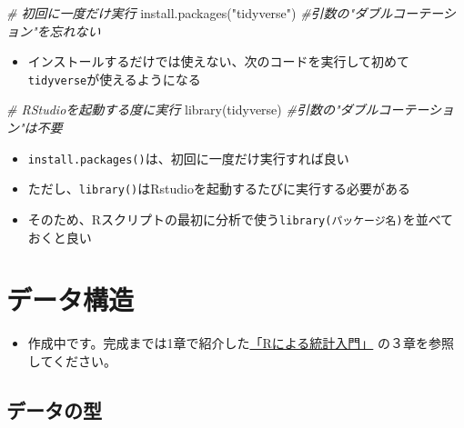 \documentclass[
]{book}
\newenvironment{Shaded}{\begin{snugshade}}{\end{snugshade}}
\newcommand{\CommentTok}[1]{\textcolor[rgb]{0.56,0.35,0.01}{\textit{#1}}}
\newcommand{\FunctionTok}[1]{\textcolor[rgb]{0.00,0.00,0.00}{#1}}
\newcommand{\NormalTok}[1]{#1}
\newcommand{\StringTok}[1]{\textcolor[rgb]{0.31,0.60,0.02}{#1}}
\providecommand{\tightlist}{%
  \setlength{\itemsep}{0pt}\setlength{\parskip}{0pt}}
\begin{document}
\begin{Shaded}
\begin{Highlighting}[]
\CommentTok{\# 初回に一度だけ実行}
\FunctionTok{install.packages}\NormalTok{(}\StringTok{"tidyverse"}\NormalTok{) }\CommentTok{\#引数の"ダブルコーテーション"を忘れない}
\end{Highlighting}
\end{Shaded}

\begin{itemize}
\tightlist
\item
  インストールするだけでは使えない、次のコードを実行して初めて\texttt{tidyverse}が使えるようになる
\end{itemize}

\begin{Shaded}
\begin{Highlighting}[]
\CommentTok{\# RStudioを起動する度に実行}
\FunctionTok{library}\NormalTok{(tidyverse) }\CommentTok{\#引数の"ダブルコーテーション"は不要}
\end{Highlighting}
\end{Shaded}

\begin{itemize}
\tightlist
\item
  \texttt{install.packages()}は、初回に一度だけ実行すれば良い
\item
  ただし、\texttt{library()}はRstudioを起動するたびに実行する必要がある
\item
  そのため、Rスクリプトの最初に分析で使う\texttt{library(パッケージ名)}を並べておくと良い
\end{itemize}

\hypertarget{ux30c7ux30fcux30bfux69cbux9020}{%
\chapter{データ構造}\label{ux30c7ux30fcux30bfux69cbux9020}}

\begin{itemize}
\tightlist
\item
  作成中です。完成までは1章で紹介した\href{https://htsuda.net/stats/}{「Rによる統計入門」} の３章を参照してください。
\end{itemize}

\hypertarget{ux30c7ux30fcux30bfux306eux578b}{%
\section{データの型}\label{ux30c7ux30fcux30bfux306eux578b}}
\end{document}
